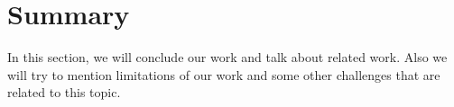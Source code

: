 \section{Summary} \label{sec:summary}

In this section, we will conclude our work and talk about related work. 
Also we will try to mention limitations of our work and some other challenges 
that are related to this topic.


